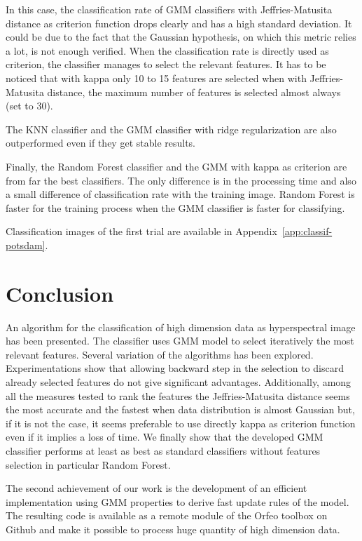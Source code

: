 \documentclass[a4paper,11pt,DIV=16,abstracton]{scrartcl}
\begin{document}
        In this case, the classification rate of GMM classifiers with Jeffries-Matusita distance as criterion function drops clearly and has a high standard deviation. It could be due to the fact that the Gaussian hypothesis, on which this metric relies a lot, is not enough verified. When the classification rate is directly used as criterion, the classifier manages to select the relevant features. It has to be noticed that with kappa only 10 to 15 features are selected when with Jeffries-Matusita distance, the maximum number of features is selected almost always (set to 30).

        The KNN classifier and the GMM classifier with ridge regularization are also outperformed even if they get stable results.

        Finally, the Random Forest classifier and the GMM with kappa as criterion are from far the best classifiers. The only difference is in the processing time and also a small difference of classification rate with the training image. Random Forest is faster for the training process when the GMM classifier is faster for classifying.

        Classification images of the first trial are available in Appendix~\ref{app:classif-potsdam}.


\section{Conclusion}

An algorithm for the classification of high dimension data as hyperspectral image has been presented. The classifier uses GMM model to select iteratively the most relevant features. Several variation of the algorithms has been explored. Experimentations show that allowing backward step in the selection to discard already selected features do not give significant advantages. Additionally, among all the measures tested to rank the features the Jeffries-Matusita distance seems the most accurate and the fastest when data distribution is almost Gaussian but, if it is not the case, it seems preferable to use directly kappa as criterion function even if it implies a loss of time. We finally show that the developed GMM classifier performs at least as best as standard classifiers without features selection in particular Random Forest.

The second achievement of our work is the development of an efficient implementation using GMM properties to derive fast update rules of the model. The resulting code is available as a remote module of the Orfeo toolbox on Github and make it possible to process huge quantity of high dimension data.
\end{document}
